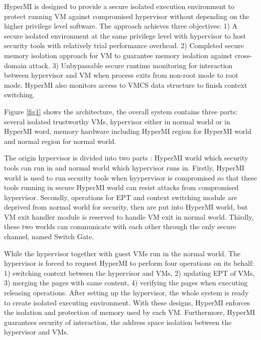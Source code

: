 \documentclass[conference]{IEEEtran}
\begin{document}
HyperMI is designed to provide a secure isolated execution environment to protect running VM against compromised hypervisor without depending on the higher privilege level software.
The approach achieves three objectives: 1) A secure isolated environment at the same privilege level with hypervisor to host security tools with relatively trial performance overhead. 2) Completed secure memory isolation approach for VM to guarantee memory isolation against cross-domain attack. 3) Unbypassable secure runtime monitoring for interaction between hypervisor and VM when process exits from non-root mode to root mode. HyperMI also monitors access to VMCS data structure to finish context switching.

Figure \ref{fig1} shows the architecture, the overall system contains three parts: several isolated trustworthy VMs, hypervisor either in normal world or in HyperMI word, memory hardware including HyperMI region for HyperMI world and normal region for normal world.

The origin hypervisor is divided into two parts : HyperMI world which security tools can run in and normal world which hypervisor runs in. Firstly, HyperMI world is used to run security tools when hyypervisor is compromised so that these tools running in secure HyperMI world can resist attacks from compromised hypervisor. Secondly, operations for EPT and context switching module are deprived from normal world for security, then are put into HyperMI world, but VM exit handler module is reserved to handle VM exit in normal world. Thirdly, these two worlds can communicate with each other through the only secure channel, named Switch Gate. 


While the hypervisor together with guest VMs run in the normal world. The hypervisor is forced to request HyperMI to perform four operations on its behalf: 1) switching context between the hypervisor and VMs, 2) updating EPT of VMs, 3) merging the pages with same content, 4) verifying the pages when executing releasing operations. After setting up the hypervisor, the whole system is ready to create isolated executing environment. With these designs, HyperMI enforces the isolation and protection of memory used by each VM. Furthermore, HyperMI guarantees security of interaction, the address space isolation between the hypervisor and VMs.
\end{document}
